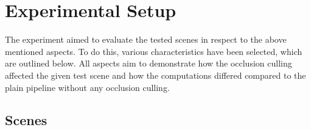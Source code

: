 \section{Experimental Setup} \label{sec-experimental-evaluation}

The experiment aimed to evaluate the tested scenes in respect to the above mentioned aspects. To do this, 
various characteristics have been selected, which are outlined below. All aspects aim to demonstrate how 
the occlusion culling affected the given test scene and how the computations differed compared to the plain 
pipeline without any occlusion culling. 


\subsection*{Scenes} \label{subsec-models}

